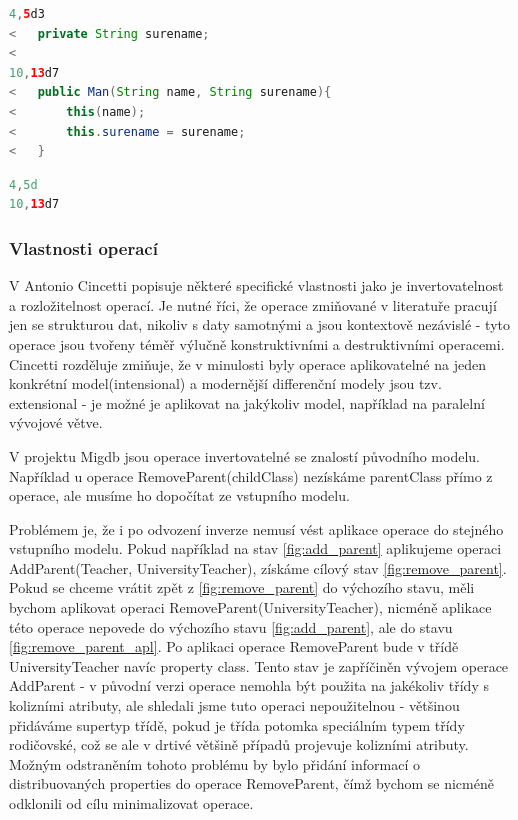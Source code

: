 \documentclass[11pt,twoside,a4paper]{book}
\begin{document}
\begin{lstlisting}[language=JAVA,frame=single,caption=diff
modelů 2 a 1,label=reverse_add_1_2] 
4,5d3
< 	private String surename;
< 
10,13d7
< 	public Man(String name, String surename){
< 		this(name);
< 		this.surename = surename;
< 	}
\end{lstlisting}

\begin{lstlisting}[language=JAVA,frame=single,caption=diff
modelů 2 a 1,label=delete_minimal] 
4,5d
10,13d7
\end{lstlisting}

\subsubsection{Vlastnosti operací}
V \cite{Cincetti} Antonio Cincetti popisuje některé specifické vlastnosti
jako je invertovatelnost a rozložitelnost operací. Je nutné říci, že operace
zmiňované v literatuře pracují jen se strukturou dat, nikoliv s daty samotnými
a jsou kontextově nezávislé - tyto operace jsou tvořeny téměř výlučně
konstruktivními a  destruktivními operacemi. Cincetti rozděluje zmiňuje, že v
minulosti byly operace aplikovatelné na jeden konkrétní model(intensional) a
modernější differenční modely jsou tzv. extensional - je možné je aplikovat na
jakýkoliv model, například na paralelní vývojové větve.

V projektu Migdb jsou operace invertovatelné se znalostí původního modelu.
Například u operace RemoveParent(childClass) nezískáme parentClass přímo z
operace, ale musíme ho dopočítat ze vstupního modelu.

Problémem je, že i po odvození inverze nemusí vést aplikace operace do stejného
vstupního modelu. Pokud například na stav \ref{fig:add_parent} aplikujeme
operaci AddParent(Teacher, UniversityTeacher), získáme cílový stav
\ref{fig:remove_parent}. Pokud se chceme vrátit zpět z \ref{fig:remove_parent}
do výchozího stavu, měli bychom aplikovat operaci
RemoveParent(UniversityTeacher), nicméně aplikace této operace nepovede do
výchozího stavu \ref{fig:add_parent}, ale do stavu \ref{fig:remove_parent_apl}.
Po aplikaci operace RemoveParent bude v třídě UniversityTeacher navíc property
class. Tento stav je zapříčiněn vývojem operace AddParent - v původní verzi
operace nemohla být použita na jakékoliv třídy s kolizními atributy, ale
shledali jsme tuto operaci nepoužitelnou - většinou přidáváme supertyp třídě,
pokud je třída potomka speciálním typem třídy rodičovské, což se ale v
drtivé většině případů projevuje kolizními atributy. Možným odstraněním tohoto
problému by bylo přidání informací o distribuovaných properties do operace
RemoveParent, čímž bychom se nicméně odklonili od cílu minimalizovat operace.
\end{document}
